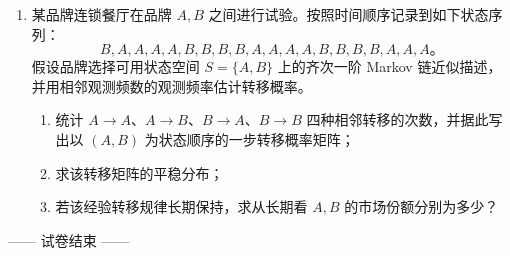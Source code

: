 \documentclass[UTF8,zihao=5,fontset=fandol]{ctexart}
\newcommand{\workarea}[1]{\vspace{#1}}
\begin{document}
\newpage
\begin{enumerate}[start=2]
  \item 某品牌连锁餐厅在品牌 $A,B$ 之间进行试验。按照时间顺序记录到如下状态序列：
        \[
          B,A,A,A,A,B,B,B,B,A,A,A,A,B,B,B,B,A,A,A\text{。}
        \]
        假设品牌选择可用状态空间 $S=\{A,B\}$ 上的齐次一阶 Markov 链近似描述，并用相邻观测频数的观测频率估计转移概率。
        \begin{enumerate}[label=(\arabic*),leftmargin=2.2em]
          \item 统计 $A\to A$、$A\to B$、$B\to A$、$B\to B$ 四种相邻转移的次数，并据此写出以 $(A,B)$ 为状态顺序的一步转移概率矩阵；
          \item 求该转移矩阵的平稳分布；
          \item 若该经验转移规律长期保持，求从长期看 $A,B$ 的市场份额分别为多少？
        \end{enumerate}

        \workarea{16cm}
\end{enumerate}

\begin{center}
  —— 试卷结束 ——
\end{center}
\end{document}
